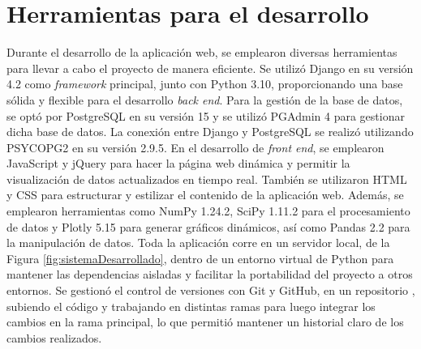 \section{Herramientas para el desarrollo}
Durante el desarrollo de la aplicación web, se emplearon diversas herramientas para llevar a cabo el proyecto de manera eficiente. Se utilizó Django en su versión 4.2 como \textit{framework} principal, junto con Python 3.10, proporcionando una base sólida y flexible para el desarrollo \textit{back end}. Para la gestión de la base de datos, se optó por PostgreSQL en su versión 15 y se utilizó PGAdmin 4 para gestionar dicha base de datos. La conexión entre Django y PostgreSQL se realizó utilizando PSYCOPG2 en su versión 2.9.5. En el desarrollo de \textit{front end}, se emplearon JavaScript y jQuery para hacer la página web dinámica y permitir la visualización de datos actualizados en tiempo real. También se utilizaron HTML y CSS para estructurar y estilizar el contenido de la aplicación web. Además, se emplearon herramientas como NumPy 1.24.2, SciPy  1.11.2 para el procesamiento de datos y Plotly 5.15 para generar gráficos dinámicos, así como Pandas 2.2 para la manipulación de datos. Toda la aplicación corre en un servidor local, de la Figura \ref{fig:sistemaDesarrollado}, dentro de un entorno virtual de Python para mantener las dependencias aisladas y facilitar la portabilidad del proyecto a otros entornos. Se gestionó el control de versiones con Git y GitHub, en un repositorio \cite{AppWebInstrumentalSMN2024}, subiendo el código y trabajando en distintas ramas para luego integrar los cambios en la rama principal, lo que permitió mantener un historial claro de los cambios realizados.
